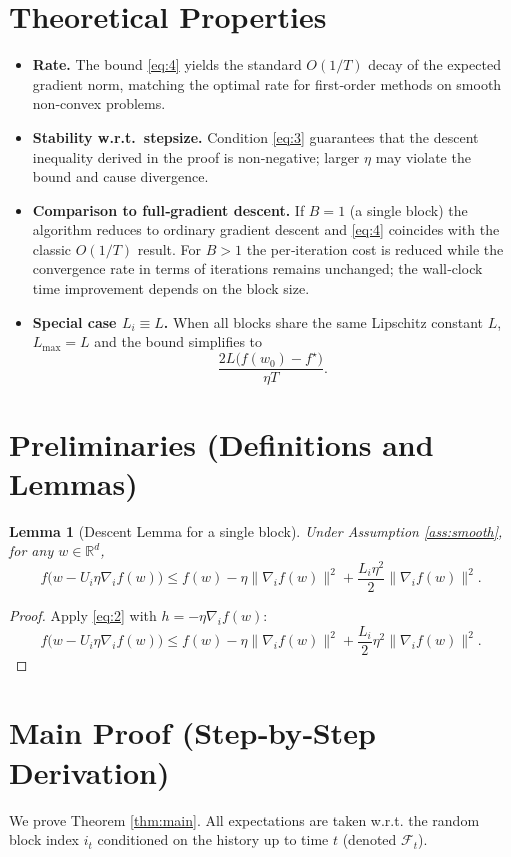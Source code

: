\documentclass{article}
\newtheorem{lemma}{Lemma}
\begin{document}
\section*{Theoretical Properties}
\begin{itemize}
\item \textbf{Rate.} The bound \eqref{eq:4} yields the standard $O(1/T)$ decay of the expected gradient norm, matching the optimal rate for first‑order methods on smooth non‑convex problems.
\item \textbf{Stability w.r.t.\ stepsize.} Condition \eqref{eq:3} guarantees that the descent inequality derived in the proof is non‑negative; larger $\eta$ may violate the bound and cause divergence.
\item \textbf{Comparison to full‑gradient descent.} If $B=1$ (a single block) the algorithm reduces to ordinary gradient descent and \eqref{eq:4} coincides with the classic $O(1/T)$ result. For $B>1$ the per‑iteration cost is reduced while the convergence rate in terms of iterations remains unchanged; the wall‑clock time improvement depends on the block size.
\item \textbf{Special case $L_i\equiv L$.} When all blocks share the same Lipschitz constant $L$, $L_{\max}=L$ and the bound simplifies to
\[
\frac{2L\bigl(f(w_0)-f^\star\bigr)}{\eta T}.
\]
\end{itemize}

\section*{Preliminaries (Definitions and Lemmas)}
\begin{lemma}[Descent Lemma for a single block]\label{lem:descent}
Under Assumption \ref{ass:smooth}, for any $w\in\mathbb{R}^d$,
\[
f\bigl(w-U_i\eta\nabla_i f(w)\bigr)
\le f(w)-\eta\|\nabla_i f(w)\|^2+\frac{L_i\eta^2}{2}\|\nabla_i f(w)\|^2 .
\tag{5}
\]
\end{lemma}
\begin{proof}
Apply \eqref{eq:2} with $h=-\eta\nabla_i f(w)$:
\[
f\bigl(w-U_i\eta\nabla_i f(w)\bigr)
\le f(w)-\eta\|\nabla_i f(w)\|^2+\frac{L_i}{2}\eta^2\|\nabla_i f(w)\|^2 .
\]
\end{proof}

\section*{Main Proof (Step‑by‑Step Derivation)}
We prove Theorem \ref{thm:main}. All expectations are taken w.r.t. the random block index $i_t$ conditioned on the history up to time $t$ (denoted $\mathcal{F}_t$).
\end{document}
